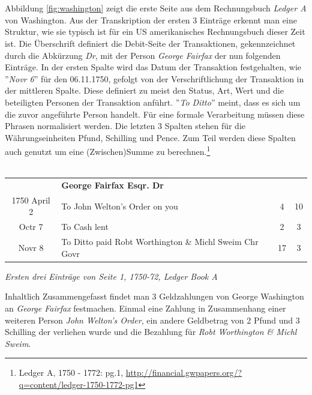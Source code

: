 \documentclass[12pt,a4paper]{article}
\begin{document}
\\
\\
Abbildung \ref{fig:washington} zeigt die erste Seite aus dem Rechnungsbuch \textit{Ledger A} von Washington. Aus der Transkription der ersten 3 Einträge erkennt man eine Struktur, wie sie typisch ist für ein US amerikanisches Rechnungsbuch dieser Zeit ist. Die Überschrift definiert die Debit-Seite der Transaktionen, gekennzeichnet durch die Abkürzung \textit{Dr}, mit der Person \textit{George Fairfax} der nun folgenden Einträge. In der ersten Spalte wird das Datum der Transaktion festgehalten, wie ''\textit{Novr 6}'' für den 06.11.1750, gefolgt von der Verschriftlichung der Transaktion in der mittleren Spalte. Diese definiert zu meist den Status, Art, Wert und die beteiligten Personen der Transaktion anführt. ''\textit{To Ditto}'' meint, dass es sich um die zuvor angeführte Person handelt. Für eine formale Verarbeitung müssen diese Phrasen normalisiert werden. Die letzten 3 Spalten stehen für die Währungseinheiten Pfund, Schilling und Pence. Zum Teil werden diese Spalten auch genutzt um eine (Zwischen)Summe zu berechnen.\footnote{Ledger A, 1750 - 1772: pg.1, \protect\url{http://financial.gwpapers.org/?q=content/ledger-1750-1772-pg1}}
\\
\\
\begin{tabular}{clcc}
& \textbf{George Fairfax Esqr. Dr}\\
1750 April 2 & To John Welton's Order on you & 4 & 10\\
Octr 7 & To Cash lent & 2 & 3 \\
Novr 8 & To Ditto paid Robt Worthington \& Michl Sweim Chr Govr &  17 & 3\\
\end{tabular}
\medskip
\begin{center}
\textit{Ersten drei Einträge von Seite 1, 1750-72, Ledger Book A}
\end{center}
Inhaltlich Zusammengefasst findet man 3 Geldzahlungen von George Washington an \textit{George Fairfax} festmachen. Einmal eine Zahlung in Zusammenhang einer weiteren Person \textit{John Welton's Order}, ein andere Geldbetrag von 2 Pfund und 3 Schilling der verliehen wurde und die Bezahlung für \textit{Robt Worthington \& Michl Sweim}.
\end{document}

